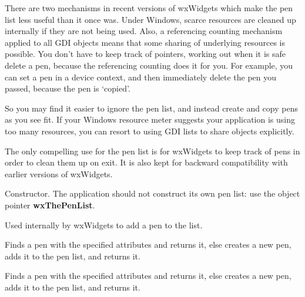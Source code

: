 There are two mechanisms in recent versions of wxWidgets which make the
pen list less useful than it once was. Under Windows, scarce resources
are cleaned up internally if they are not being used. Also, a referencing
counting mechanism applied to all GDI objects means that some sharing
of underlying resources is possible. You don't have to keep track of pointers,
working out when it is safe delete a pen, because the referencing counting does
it for you. For example, you can set a pen in a device context, and then
immediately delete the pen you passed, because the pen is `copied'.

So you may find it easier to ignore the pen list, and instead create
and copy pens as you see fit. If your Windows resource meter suggests
your application is using too many resources, you can resort to using
GDI lists to share objects explicitly.

The only compelling use for the pen list is for wxWidgets to keep
track of pens in order to clean them up on exit. It is also kept for
backward compatibility with earlier versions of wxWidgets.






Constructor. The application should not construct its own pen list:
use the object pointer {\bf wxThePenList}.

\label{wxpenlistaddpen}


Used internally by wxWidgets to add a pen to the list.

\label{wxpenlistfindorcreatepen}


Finds a pen with the specified attributes and returns it, else creates a new pen, adds it
to the pen list, and returns it.


Finds a pen with the specified attributes and returns it, else creates a new pen, adds it
to the pen list, and returns it.

